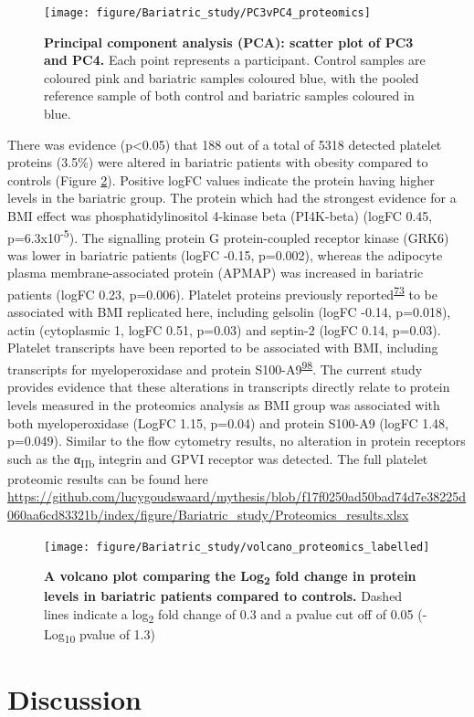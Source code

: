 \documentclass[11pt,twoside]{bristolthesis}
\begin{document}
\begin{figure}
\texttt{[image: figure/Bariatric\_study/PC3vPC4\_proteomics]} \caption[Principal component analysis (PCA): scatter plot of PC3 and PC4.]{\textbf{Principal component analysis (PCA): scatter plot of PC3 and PC4.} Each point represents a participant. Control samples are coloured pink and bariatric samples coloured blue, with the pooled reference sample of both control and bariatric samples coloured in blue.}\label{fig:pca2}
\end{figure}
There was evidence (p\textless0.05) that 188 out of a total of 5318 detected platelet proteins (3.5\%) were altered in bariatric patients with obesity compared to controls (Figure \ref{fig:volcano}). Positive logFC values indicate the protein having higher levels in the bariatric group. The protein which had the strongest evidence for a BMI effect was phosphatidylinositol 4-kinase beta (PI4K-beta) (logFC 0.45, p=6.3x10\textsuperscript{-5}). The signalling protein G protein-coupled receptor kinase (GRK6) was lower in bariatric patients (logFC -0.15, p=0.002), whereas the adipocyte plasma membrane-associated protein (APMAP) was increased in bariatric patients (logFC 0.23, p=0.006). Platelet proteins previously reported\textsuperscript{\protect\hyperlink{ref-Barrachina2019}{73}} to be associated with BMI replicated here, including gelsolin (logFC -0.14, p=0.018), actin (cytoplasmic 1, logFC 0.51, p=0.03) and septin-2 (logFC 0.14, p=0.03). Platelet transcripts have been reported to be associated with BMI, including transcripts for myeloperoxidase and protein S100-A9\textsuperscript{\protect\hyperlink{ref-Freedman2010}{98}}. The current study provides evidence that these alterations in transcripts directly relate to protein levels measured in the proteomics analysis as BMI group was associated with both myeloperoxidase (LogFC 1.15, p=0.04) and protein S100-A9 (logFC 1.48, p=0.049). Similar to the flow cytometry results, no alteration in protein receptors such as the α\textsubscript{IIb} integrin and GPVI receptor was detected. The full platelet proteomic results can be found here \url{https://github.com/lucygoudswaard/mythesis/blob/f17f0250ad50bad74d7e38225d060aa6cd83321b/index/figure/Bariatric_study/Proteomics_results.xlsx}



\begin{figure}
\texttt{[image: figure/Bariatric\_study/volcano\_proteomics\_labelled]} \caption[A volcano plot comparing the Log\textsubscript{2} fold change in protein levels in bariatric patients compared to controls]{\textbf{A volcano plot comparing the Log\textsubscript{2} fold change in protein levels in bariatric patients compared to controls.} Dashed lines indicate a log\textsubscript{2} fold change of 0.3 and a pvalue cut off of 0.05 (-Log\textsubscript{10} pvalue of 1.3)}\label{fig:volcano}
\end{figure}
\hypertarget{discussion-1}{%
\section{Discussion}\label{discussion-1}}
\end{document}

